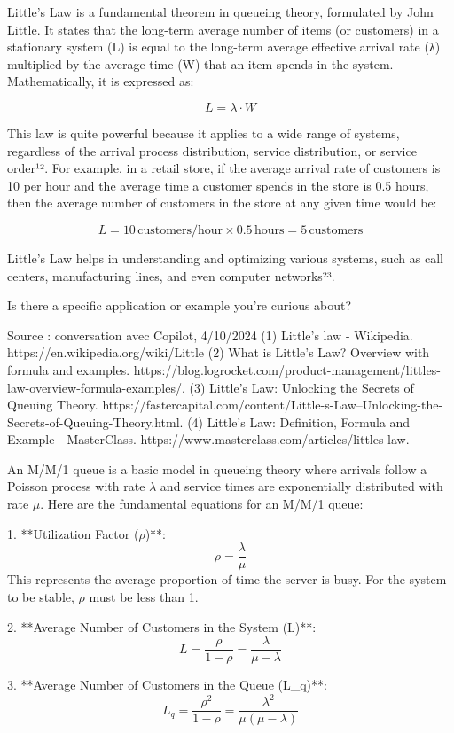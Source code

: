 Little's Law is a fundamental theorem in queueing theory, formulated by John Little. It states that the long-term average number of items (or customers) in a stationary system (L) is equal to the long-term average effective arrival rate (λ) multiplied by the average time (W) that an item spends in the system. Mathematically, it is expressed as:

$$L = \lambda \cdot W$$

This law is quite powerful because it applies to a wide range of systems, regardless of the arrival process distribution, service distribution, or service order¹². For example, in a retail store, if the average arrival rate of customers is 10 per hour and the average time a customer spends in the store is 0.5 hours, then the average number of customers in the store at any given time would be:

$$L = 10 \, \text{customers/hour} \times 0.5 \, \text{hours} = 5 \, \text{customers}$$

Little's Law helps in understanding and optimizing various systems, such as call centers, manufacturing lines, and even computer networks²³.

Is there a specific application or example you're curious about?

Source : conversation avec Copilot, 4/10/2024
(1) Little's law - Wikipedia. https://en.wikipedia.org/wiki/Little%
(2) What is Little’s Law? Overview with formula and examples. https://blog.logrocket.com/product-management/littles-law-overview-formula-examples/.
(3) Little's Law: Unlocking the Secrets of Queuing Theory. https://fastercapital.com/content/Little-s-Law--Unlocking-the-Secrets-of-Queuing-Theory.html.
(4) Little’s Law: Definition, Formula and Example - MasterClass. https://www.masterclass.com/articles/littles-law.

An M/M/1 queue is a basic model in queueing theory where arrivals follow a Poisson process with rate \(\lambda\) and service times are exponentially distributed with rate \(\mu\). Here are the fundamental equations for an M/M/1 queue:

1. **Utilization Factor (\(\rho\))**:
   $$\rho = \frac{\lambda}{\mu}$$
   This represents the average proportion of time the server is busy. For the system to be stable, \(\rho\) must be less than 1.

2. **Average Number of Customers in the System (L)**:
   $$L = \frac{\rho}{1 - \rho} = \frac{\lambda}{\mu - \lambda}$$

3. **Average Number of Customers in the Queue (L_q)**:
   $$L_q = \frac{\rho^2}{1 - \rho} = \frac{\lambda^2}{\mu(\mu - \lambda)}$$

